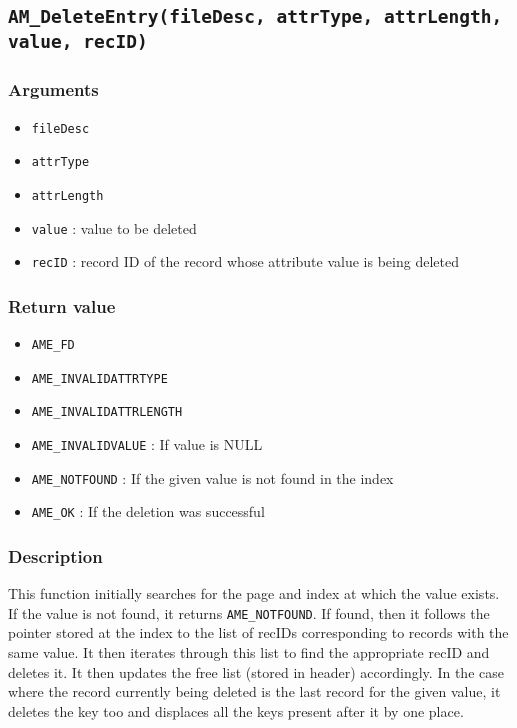 \documentclass[a4paper, 12pt]{article}
\begin{document}
\subsection{\texttt{AM\_DeleteEntry(fileDesc, attrType, attrLength, value, recID)}}
\subsubsection{Arguments}
\begin{itemize}
	\item{\texttt{fileDesc}}
	\item{\texttt{attrType}}
	\item{\texttt{attrLength}}
	\item{\texttt{value} : value to be deleted}
	\item{\texttt{recID} : record ID of the record whose attribute value is being deleted}
\end{itemize}
\subsubsection{Return value}
\begin{itemize}
	\item{\texttt{AME\_FD}}
	\item{\texttt{AME\_INVALIDATTRTYPE}}
	\item{\texttt{AME\_INVALIDATTRLENGTH}}
	\item{\texttt{AME\_INVALIDVALUE} : If value is NULL}
	\item{\texttt{AME\_NOTFOUND} : If the given value is not found in the index}
	\item{\texttt{AME\_OK} : If the deletion was successful}
\end{itemize}
\subsubsection{Description}
This function initially searches for the page and index at which the value exists. If the value is not found, it returns \texttt{AME\_NOTFOUND}. If found, then it follows the pointer stored at the index to the list of recIDs corresponding to records with the same value. It then iterates through this list to find the appropriate recID and deletes it. It then updates the free list (stored in header) accordingly. In the case where the record currently being deleted is the last record for the given value, it deletes the key too and displaces all the keys present after it by one place.
\end{document}
